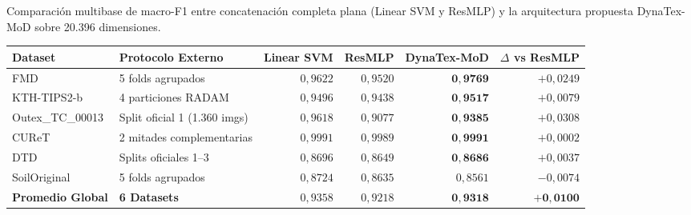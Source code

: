 \begin{resulttable}
\centering\fontsize{8}{10}\selectfont\setlength{\tabcolsep}{4.0pt}
\caption{Comparación multibase de macro-F1 entre concatenación completa plana (Linear SVM y ResMLP) y la arquitectura propuesta DynaTex-MoD sobre 20.396 dimensiones.}
\label{tab:dynatex-multidataset}
\begin{tabular}{@{}llrrrr@{}}
\toprule
Dataset & Protocolo Externo & Linear SVM & ResMLP & \textbf{DynaTex-MoD} & $\Delta$ vs ResMLP \\
\midrule
FMD & 5 folds agrupados & $0{,}9622$ & $0{,}9520$ & $\mathbf{0{,}9769}$ & $+0{,}0249$ \\
KTH-TIPS2-b & 4 particiones RADAM & $0{,}9496$ & $0{,}9438$ & $\mathbf{0{,}9517}$ & $+0{,}0079$ \\
Outex\_TC\_00013 & Split oficial 1 (1.360 imgs) & $0{,}9618$ & $0{,}9077$ & $\mathbf{0{,}9385}$ & $+0{,}0308$ \\
CUReT & 2 mitades complementarias & $0{,}9991$ & $0{,}9989$ & $\mathbf{0{,}9991}$ & $+0{,}0002$ \\
DTD & Splits oficiales 1--3 & $0{,}8696$ & $0{,}8649$ & $\mathbf{0{,}8686}$ & $+0{,}0037$ \\
SoilOriginal & 5 folds agrupados & $0{,}8724$ & $0{,}8635$ & $0{,}8561$ & $-0{,}0074$ \\
\midrule
\textbf{Promedio Global} & \textbf{6 Datasets} & $0{,}9358$ & $0{,}9218$ & $\mathbf{0{,}9318}$ & $\mathbf{+0{,}0100}$ \\
\bottomrule
\end{tabular}
\end{resulttable}
